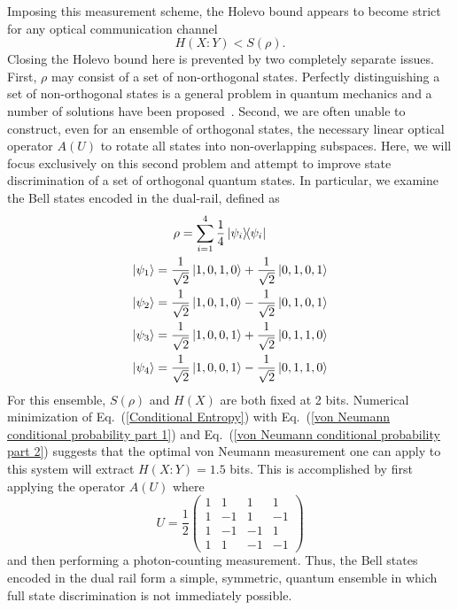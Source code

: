 \documentclass[aps,pra,twocolumn,showpacs,superscriptaddress,floatfix,10pt]{revtex4}
\begin{document}
Imposing this measurement scheme, the Holevo bound appears to become strict for any optical communication channel
\begin{equation}
	H(X:Y) < S(\rho).
\end{equation}
Closing the Holevo bound here is prevented by two completely separate issues. First, $\rho$ may consist of a set of non-orthogonal states. Perfectly distinguishing a set of non-orthogonal states is a general problem in quantum mechanics and a number of solutions have been proposed~\cite{Hausladen,Lloyd,Lloyd Other,Ogawa,Nagaoka,Hayashi}. Second, we are often unable to construct, even for an ensemble of orthogonal states, the necessary linear optical operator $A(U)$ to rotate all states into  non-overlapping subspaces. Here, we will focus exclusively on this second problem and attempt to improve state discrimination of a set of orthogonal quantum states. In particular, we examine the Bell states encoded in the dual-rail, defined as
\begin{eqnarray}
\rho  = \sum_{i=1}^4 \frac{1}{4} \outerproduct{\psi_i}{\psi_i} \quad \quad \quad \quad \quad \\
\ket{\psi_1} = \frac{1}{\sqrt{2}} \ket{1,0,1,0} + \frac{1}{\sqrt{2}} \ket{0,1,0,1} \\
\ket{\psi_2} = \frac{1}{\sqrt{2}} \ket{1,0,1,0} - \frac{1}{\sqrt{2}} \ket{0,1,0,1} \\
\ket{\psi_3} = \frac{1}{\sqrt{2}} \ket{1,0,0,1} + \frac{1}{\sqrt{2}} \ket{0,1,1,0} \\
\ket{\psi_4} = \frac{1}{\sqrt{2}} \ket{1,0,0,1} - \frac{1}{\sqrt{2}} \ket{0,1,1,0}
\end{eqnarray}
For this ensemble, $S(\rho)$ and $H(X)$ are both fixed at 2 bits. Numerical minimization of Eq.~(\ref{Conditional Entropy}) with Eq.~(\ref{von Neumann conditional probability part 1}) and Eq.~(\ref{von Neumann conditional probability part 2}) suggests that the optimal von Neumann measurement one can apply to this system will extract $H(X:Y) = 1.5$ bits. This is accomplished by first applying the operator $A(U)$ where
\begin{equation}
\label{First U}
U = \frac{1}{2} \begin{pmatrix} 1 & 1 & 1 & 1 \\ 1 & -1 & 1 & -1 \\ 1 & -1 & -1 & 1 \\ 1 & 1 & -1 & -1 \end{pmatrix}   
\end{equation}
and then performing a photon-counting measurement. Thus, the Bell states encoded in the dual rail form a simple, symmetric, quantum ensemble in which full state discrimination is not immediately possible. 
\end{document}

